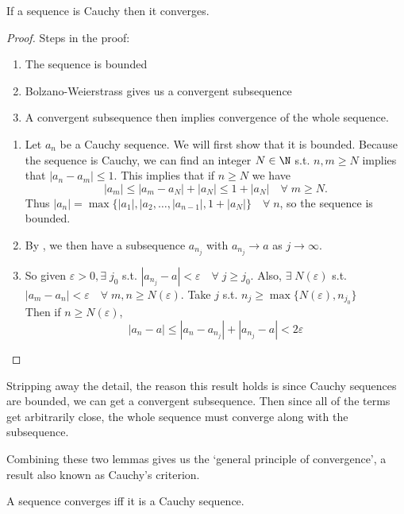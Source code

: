 \begin{lemma}[Completeness]
	If a sequence is Cauchy then it converges.
\end{lemma}
\begin{proof}
	Steps in the proof:
	\begin{enumerate}
		\item The sequence is bounded
		\item Bolzano-Weierstrass gives us a convergent subsequence 
		\item A convergent subsequence then implies convergence of the whole sequence.
	\end{enumerate}

	\begin{enumerate}
		\item Let $a_n$ be a Cauchy sequence. We will first show that it is bounded. 
		Because the sequence is Cauchy, we can find an integer $N \in \N$ s.t. $n, m \geq N$ implies that $|a_n - a_m| \leq 1$.
		This implies that if $n \geq N$ we have
		$$
			|a_m| \leq |a_m - a_N| + |a_N| \leq 1 + |a_N| \quad \forall \; m \geq N.
		$$
		Thus $|a_n| = \max \{|a_1|, |a_2, \dots, |a_{n-1}|, 1 + |a_N|\} \quad \forall \; n$, so the sequence is bounded.
		\item By , we then have a subsequence $a_{n_j}$ with $a_{n_j} \rightarrow a$ as $j \rightarrow \infty$. 
		\item So given $\varepsilon > 0, \exists \; j_0$ s.t. $|a_{n_j} - a| < \varepsilon \quad \forall \; j \geq j_0$. 
		Also, $\exists \; N(\varepsilon)$ s.t. $|a_m - a_n| < \varepsilon \quad \forall \; m,n \geq N(\varepsilon)$.
		Take $j$ s.t. $n_j \geq \max\{N(\varepsilon), n_{j_0}\}$\\
		Then if $n \geq N(\varepsilon)$,
		\[|a_n - a| \leq |a_n - a_{n_j}| + |a_{n_j} - a| < 2 \varepsilon \]
	
	\end{enumerate} 
\end{proof}

Stripping away the detail, the reason this result holds is since Cauchy sequences are bounded, we can get a convergent subsequence. Then since all of the terms get arbitrarily close, the whole sequence must converge along with the subsequence.

Combining these two lemmas gives us the `general principle of convergence', a result also known as Cauchy's criterion.

\begin{theorem}
	A sequence converges iff it is a Cauchy sequence.
\end{theorem}

\clearpage